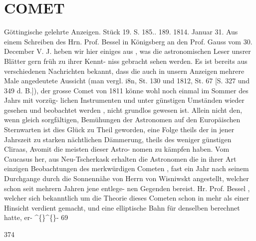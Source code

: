 \documentclass[12pt,a4paper]{article}
\begin{document}
\section*{COMET}
Göttingische  gelehrte  Anzeigen.     Stück  19.     S.  185..  189.     1814.  Januar  31. 
Aus  einem  Schreiben  des  Hrn.  Prof.  Bessel  in  Königsberg  an  den  Prof.  Gauss  vom  30.  December 
V.  J.  heben  wir  hier  einiges  aus ,  was  die  astronomischen  Leser  unsrer  Blätter  gern  früh  zu  ihrer  Kennt- 
niss  gebracht  sehen  werden.  Es  ist  bereits  aus  verschiedenen  Nachrichten  bekannt,  dass  die  auch  in 
unsern  Anzeigen  mehrere  Male  angedeutete  Aussicht  (man  vergl.  i8n,  St.  130  und  1812,  St.  67  [S.  327 
und  349  d.  B.]),  der  grosse  Comet  von  1811  könne  wohl  noch  einmal  im  Sommer  des  Jahrs  mit  vorzüg- 
lichen Instrumenten  und  unter  günstigen  Umständen  wieder  gesehen  und  beobachtet  werden ,  nicht 
grundlos  gewesen  ist.  Allein  nicht  den,  wenn  gleich  sorgfältigen,  Bemühungen  der  Astronomen  auf  den 
Europäischen  Sternwarten  ist  dies  Glück  zu  Theil  geworden,  eine  Folge  theils  der  in  jener  Jahrszeit  zu 
starken  nächtlichen  Dämmerung,  theils  des  weniger  günstigen  Cliraas,  Avomit  die  meisten  dieser  Astro- 
nomen zu  kämpfen  haben.  Vom  Caucasus  her,  aus  Neu-Tscherkask  erhalten  die  Astronomen  die  in  ihrer 
Art  einzigen  Beobachtungen  des  merkwürdigen  Cometen ,  fast  ein  Jahr  nach  seinem  Durchgange  durch 
die  Sonnennähe  von  Herrn  von  Wisniwskt  angestellt,  welcher  schon  seit  mehrern  Jahren  jene  entlege- 
nen Gegenden  bereist.  Hr.  Prof.  Bessel  ,  welcher  sich  bekanntlich  um  die  Theorie  dieses  Cometen  schon 
in  mehr  als  einer  Hinsicht  verdient  gemacht,  und  eine  elliptische  Bahn  für  denselben  berechnet  hatte,  er- 
\textasciicircum\{\}\textasciicircum\{\}-  69 


\newpage
374 
\end{document}
